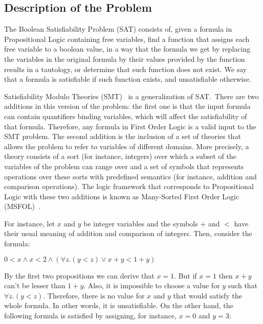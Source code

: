 \subsection{Description of the Problem}

The Boolean Satisfiability Problem (SAT) consists of, given a formula in Propositional Logic containing free variables, find a function that assigns each free variable to a boolean value, in a way that the formula we get by replacing the variables in the original formula by their values provided by the function results in a tautology, or determine that such function does not exist. We say that a formula is satisfiable if such function exists, and unsatisfiable otherwise.

Satisfiability Modulo Theories (SMT)~\cite{smt} is a generalization of SAT.\ There are two additions in this version of the problem: the first one is that the input formula can contain quantifiers binding variables, which will affect the satisfiability of that formula. Therefore, any formula in First Order Logic is a valid input to the SMT problem. The second addition is the inclusion of a set of theories that allows the problem to refer to variables of different domains. More precisely, a theory consists of a sort (for instance, integers) over which a subset of the variables of the problem can range over and a set of symbols that represents operations over these sorts with predefined semantics (for instance, addition and comparison operations). The logic framework that corresponds to Propositional Logic with these two additions is known as Many-Sorted First Order Logic (MSFOL)~\cite{many_sorted}.

For instance, let $x$ and $y$ be integer variables and the symbols $+$ and $<$ have their usual meaning of addition and comparison of integers. Then, consider the formula:

\begin{center}
  $0 < x \land x < 2 \land (\forall z . (y < z) \lor x + y < 1 + y)$
\end{center}

By the first two propositions we can derive that $x = 1$. But if $x = 1$ then $x + y$ can't be lesser than $1 + y$. Also, it is impossible to choose a value for $y$ such that $\forall z . (y < z)$. Therefore, there is no value for $x$ and $y$ that would satisfy the whole formula. In other words, it is unsatisfiable. On the other hand, the following formula is satisfied by assigning, for instance, $x = 0$ and $y = 3$:

